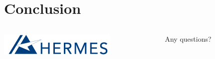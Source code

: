 












\section{Conclusion}

\begin{frame}
\begin{columns}
\begin{column}{0.4\linewidth}
\includegraphics[keepaspectratio,width=\linewidth]{img/hermes}
\end{column}
\begin{column}{0.6\linewidth}
\centering
\Huge{Any questions?}
\end{column}
\end{columns}
\end{frame}



